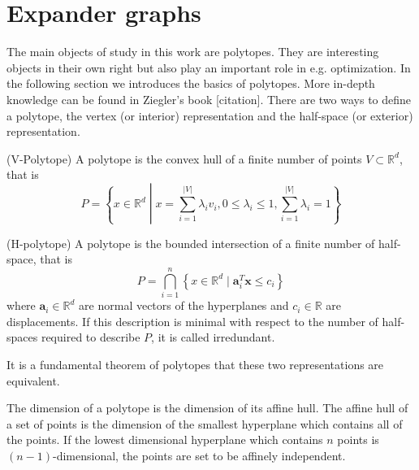 \chapter{Expander graphs}
\label{mathchapter}


The main objects of study in this work are polytopes. They are interesting 
objects in their own right but also play an important role in e.g. 
optimization. In the following section we introduces the basics of polytopes. 
More in-depth knowledge can be found in Ziegler's book [citation]. There are 
two ways to define a polytope, the vertex (or interior) representation and the 
half-space (or exterior) representation.

\begin{definition}
(V-Polytope) A polytope is the convex hull of a finite number of points $V 
\subset \mathbb{R}^d$, that is 
\begin{equation}
 P = \left\{x\in \mathbb{R}^d \middle| x = \sum_{i=1}^{|V|} \lambda_i v_i, 
0\leq \lambda_i \leq 1, \sum_{i=1}^{|V|} \lambda_i = 1 \right\}
\end{equation}

\end{definition}

\begin{definition}
 (H-polytope) A polytope is the bounded intersection of a finite number of 
half-space, that is
\begin{equation}
 P = \bigcap_{i=1}^n \left\{x \in \mathbb{R}^d \mid \mathbf{a}_i^T \mathbf{x} 
\leq 
c_i \right\}
\end{equation}
where $\mathbf{a}_i \in \mathbb{R}^d$ are normal vectors of the hyperplanes and 
$c_i \in 
\mathbb{R}$ are displacements. If this description is minimal with respect to 
the number of half-spaces required to describe $P$, it is called irredundant.
\end{definition}

It is a fundamental theorem of polytopes that these two representations are 
equivalent.

The dimension of a polytope is the dimension of its affine hull. The affine 
hull of a set of points is the dimension of the smallest hyperplane which 
contains all of the points. If the lowest dimensional hyperplane which contains 
$n$ points is $(n-1)$-dimensional, the points are set to be affinely 
independent.

